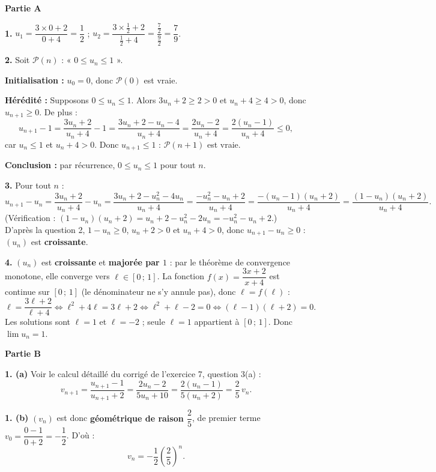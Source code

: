 \documentclass[11pt]{article}
\begin{document}
\begin{corrige}
\textbf{Partie A}

\textbf{1.} $u_1 = \dfrac{3 \times 0 + 2}{0 + 4} = \dfrac{1}{2}$ ; \quad $u_2 = \dfrac{3 \times \frac{1}{2} + 2}{\frac{1}{2} + 4} = \dfrac{\frac{7}{2}}{\frac{9}{2}} = \dfrac{7}{9}$.

\textbf{2.} Soit $\mathcal{P}(n)$ : « $0 \leq u_n \leq 1$ ».

\textbf{Initialisation :} $u_0 = 0$, donc $\mathcal{P}(0)$ est vraie.

\textbf{Hérédité :} Supposons $0 \leq u_n \leq 1$. Alors $3u_n + 2 \geq 2 > 0$ et $u_n + 4 \geq 4 > 0$, donc $u_{n+1} \geq 0$. De plus :
\[ u_{n+1} - 1 = \frac{3u_n + 2}{u_n + 4} - 1 = \frac{3u_n + 2 - u_n - 4}{u_n + 4} = \frac{2u_n - 2}{u_n + 4} = \frac{2(u_n - 1)}{u_n + 4} \leq 0, \]
car $u_n \leq 1$ et $u_n + 4 > 0$. Donc $u_{n+1} \leq 1$ : $\mathcal{P}(n+1)$ est vraie.

\textbf{Conclusion :} par récurrence, $0 \leq u_n \leq 1$ pour tout $n$.

\textbf{3.} Pour tout $n$ :
\[ u_{n+1} - u_n = \frac{3u_n + 2}{u_n + 4} - u_n = \frac{3u_n + 2 - u_n^2 - 4u_n}{u_n + 4} = \frac{-u_n^2 - u_n + 2}{u_n + 4} = \frac{-(u_n - 1)(u_n + 2)}{u_n + 4} = \frac{(1 - u_n)(u_n + 2)}{u_n + 4}. \]
(Vérification : $(1-u_n)(u_n+2) = u_n + 2 - u_n^2 - 2u_n = -u_n^2 - u_n + 2$.) D'après la question 2, $1 - u_n \geq 0$, $u_n + 2 > 0$ et $u_n + 4 > 0$, donc $u_{n+1} - u_n \geq 0$ : $(u_n)$ est \textbf{croissante}.

\textbf{4.} $(u_n)$ est \textbf{croissante} et \textbf{majorée par $1$} : par le théorème de convergence monotone, elle converge vers $\ell \in [0\,;\,1]$. La fonction $f(x) = \dfrac{3x+2}{x+4}$ est continue sur $[0\,;\,1]$ (le dénominateur ne s'y annule pas), donc $\ell = f(\ell)$ :
\[ \ell = \frac{3\ell + 2}{\ell + 4} \iff \ell^2 + 4\ell = 3\ell + 2 \iff \ell^2 + \ell - 2 = 0 \iff (\ell - 1)(\ell + 2) = 0. \]
Les solutions sont $\ell = 1$ et $\ell = -2$ ; seule $\ell = 1$ appartient à $[0\,;\,1]$. Donc $\lim u_n = 1$.

\textbf{Partie B}

\textbf{1. (a)} Voir le calcul détaillé du corrigé de l'exercice 7, question 3(a) :
\[ v_{n+1} = \frac{u_{n+1} - 1}{u_{n+1} + 2} = \frac{2u_n - 2}{5u_n + 10} = \frac{2(u_n - 1)}{5(u_n + 2)} = \frac{2}{5}\,v_n. \]

\textbf{1. (b)} $(v_n)$ est donc \textbf{géométrique de raison $\dfrac{2}{5}$}, de premier terme $v_0 = \dfrac{0-1}{0+2} = -\dfrac{1}{2}$. D'où :
\[ v_n = -\frac{1}{2}\left(\frac{2}{5}\right)^n. \]


\end{corrige}
\end{document}
